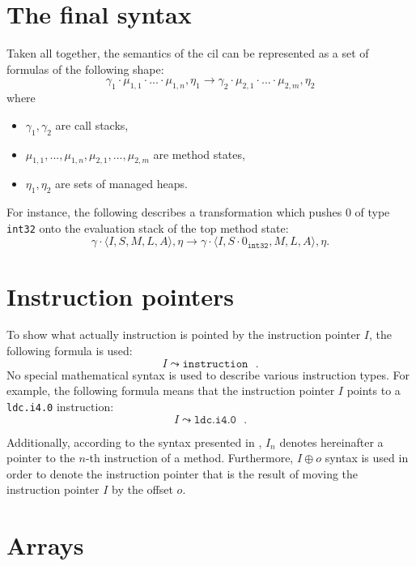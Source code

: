 \documentclass[declaration,shortabstract,english,mgr]{iithesis}
\newcommand{\mstate}[5] {
	\langle#1, #2, #3, #4, #5\rangle
}
\newcommand{\ipointsto}[3] {
	#1 \leadsto \texttt{#2} \text{ } #3
}
\begin{document}
\section{The final syntax}

Taken all together, the semantics of the \acrshort{cil} can be represented as a set of formulas of the following shape:
\begin{equation}
\label{eq:finalSyntax}
	\gamma_1 \cdot \mu_{1,1} \cdot ... \cdot \mu_{1,n}, \eta_1 \rightarrow \gamma_2 \cdot \mu_{2,1} \cdot ... \cdot \mu_{2,m}, \eta_2
\end{equation}
where
\begin{itemize}
	\item{$\gamma_1, \gamma_2$ are call stacks,}
	\item{$\mu_{1,1}, ..., \mu_{1,n}, \mu_{2, 1}, ..., \mu_{2, m}$ are method states,}
	\item{$\eta_1, \eta_2$ are sets of managed heaps.}
\end{itemize}

For instance, the following describes a transformation which pushes 0 of type \texttt{int32} onto the evaluation stack of the top method state:
$$
	\gamma \cdot \mstate{I}{S}{M}{L}{A}, \eta \rightarrow \gamma \cdot \mstate{I}{S \cdot 0_\texttt{int32}}{M}{L}{A}, \eta.
$$

\section{Instruction pointers}

To show what actually instruction is pointed by the instruction pointer $I$, the following formula is used:
\begin{equation}
	\ipointsto{I}{instruction}.
\end{equation}
No special mathematical syntax is used to describe various instruction types. For example, the following formula means that the instruction pointer $I$ points to a \texttt{ldc.i4.0} instruction:
$$
	\ipointsto{I}{ldc.i4.0}.
$$

Additionally, according to the syntax presented in \cite{zychlaThesis}, $I_n$ denotes hereinafter a pointer to the $n$-th instruction of a method. Furthermore, $I \oplus o$ syntax is used in order to denote the instruction pointer that is the result of moving the instruction pointer $I$ by the offset $o$.

\section{Arrays}
\end{document}
